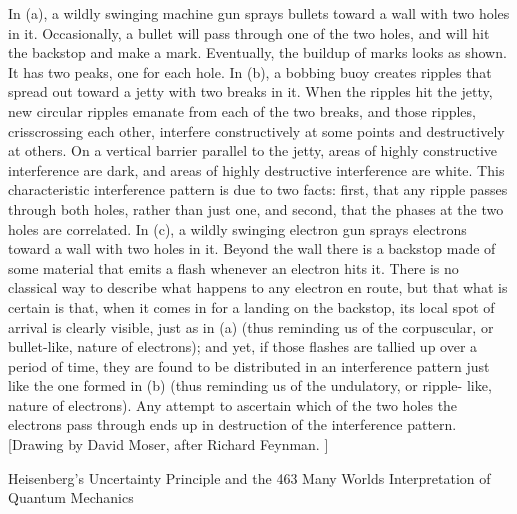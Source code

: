         In (a), a wildly swinging machine gun sprays bullets toward a wall with two
holes in it. Occasionally, a bullet will pass through one of the two holes, and will hit
the backstop and make a mark. Eventually, the buildup of marks looks as shown. It
has two peaks, one for each hole.
        In (b), a bobbing buoy creates ripples that spread out toward a jetty with two
breaks in it. When the ripples hit the jetty, new circular ripples emanate from each of
the two breaks, and those ripples, crisscrossing each other, interfere constructively at
some points and destructively at others. On a vertical barrier parallel to the jetty, areas
of highly constructive interference are dark, and areas of highly destructive
interference are white. This characteristic interference pattern is due to two facts: first,
that any ripple passes through both holes, rather than just one, and second, that the
phases at the two holes are correlated.
        In (c), a wildly swinging electron gun sprays electrons toward a wall with two
holes in it. Beyond the wall there is a backstop made of some material that emits a
flash whenever an electron hits it. There is no classical way to describe what happens
to any electron en route, but that what is certain is that, when it comes in for a landing
on the backstop, its local spot of arrival is clearly visible, just as in (a) (thus reminding
us of the corpuscular, or bullet-like, nature of electrons); and yet, if those flashes are
tallied up over a period of time, they are found to be distributed in an interference
pattern just like the one formed in (b) (thus reminding us of the undulatory, or ripple-
like, nature of electrons). Any attempt to ascertain which of the two holes the
electrons pass through ends up in destruction of the interference pattern. [Drawing by
David Moser, after Richard Feynman. ]

Heisenberg's Uncertainty Principle and the                                              463
Many Worlds Interpretation of Quantum Mechanics

